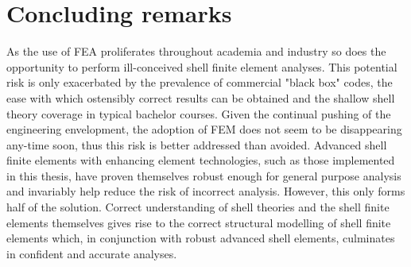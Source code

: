 \section{Concluding remarks}

As the use of FEA proliferates throughout academia and industry so does the opportunity to perform ill-conceived shell finite element analyses. This potential risk is only exacerbated by the prevalence of commercial "black box" codes, the ease with which ostensibly correct results can be obtained and the shallow shell theory coverage in typical bachelor courses. Given the continual pushing of the engineering envelopment, the adoption of FEM does not seem to be disappearing any-time soon, thus this risk is better addressed than avoided. Advanced shell finite elements with enhancing element technologies, such as those implemented in this thesis, have proven themselves robust enough for general purpose analysis and invariably help reduce the risk of incorrect analysis. However, this only forms half of the solution. Correct understanding of shell theories and the shell finite elements themselves gives rise to the correct structural modelling of shell finite elements which, in conjunction with robust advanced shell elements, culminates in confident and accurate analyses.